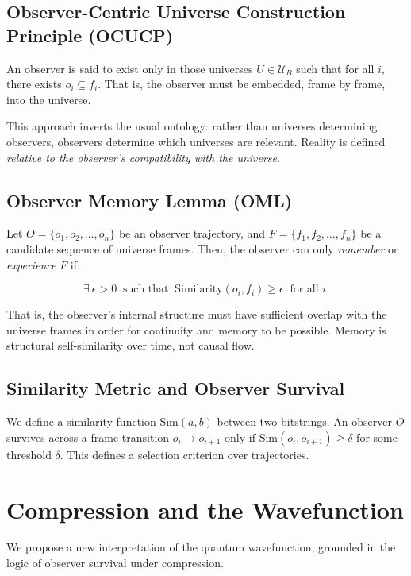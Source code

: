 \documentclass[12pt]{article}
\begin{document}
\subsection{Observer-Centric Universe Construction Principle (OCUCP)}

An observer is said to exist only in those universes $U \in \mathcal{U}_B$ such that for all $i$, there exists $o_i \subseteq f_i$. That is, the observer must be embedded, frame by frame, into the universe.

This approach inverts the usual ontology: rather than universes determining observers, observers determine which universes are relevant. Reality is defined \emph{relative to the observer's compatibility with the universe}.

\subsection{Observer Memory Lemma (OML)}

Let $O = \{o_1, o_2, \ldots, o_n\}$ be an observer trajectory, and $F = \{f_1, f_2, \ldots, f_n\}$ be a candidate sequence of universe frames. Then, the observer can only \emph{remember} or \emph{experience} $F$ if:

\[
    \exists\ \epsilon > 0\ \text{ such that }\ \text{Similarity}(o_i, f_i) \ge \epsilon\ \text{ for all } i.
\]

That is, the observer's internal structure must have sufficient overlap with the universe frames in order for continuity and memory to be possible. Memory is structural self-similarity over time, not causal flow.

\subsection{Similarity Metric and Observer Survival}

We define a similarity function $\text{Sim}(a, b)$ between two bitstrings. An observer $O$ survives across a frame transition $o_i \to o_{i+1}$ only if $\text{Sim}(o_i, o_{i+1}) \ge \delta$ for some threshold $\delta$. This defines a selection criterion over trajectories.

\section{Compression and the Wavefunction}

We propose a new interpretation of the quantum wavefunction, grounded in the logic of observer survival under compression.
\end{document}
